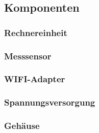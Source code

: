 \subsection{Komponenten}
\subsubsection{Rechnereinheit}
\subsubsection{Messsensor}
\subsubsection{WIFI-Adapter}
\subsubsection{Spannungsversorgung}
\subsubsection{Gehäuse}